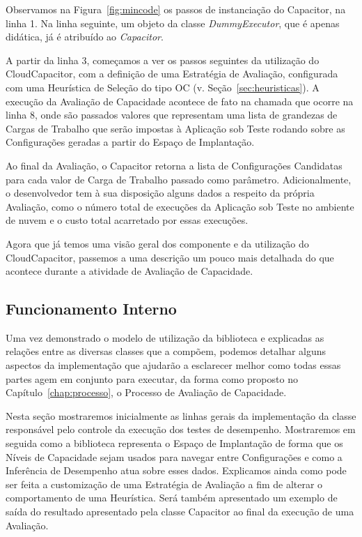 Observamos na Figura~\ref{fig:mincode} os passos de instanciação do Capacitor,
na linha 1. Na linha seguinte, um objeto da classe \emph{DummyExecutor}, que é
apenas didática, já é atribuído ao \emph{Capacitor}.

A partir da linha 3, começamos a ver os passos seguintes da utilização do 
CloudCapacitor, com a definição de uma Estratégia de Avaliação, configurada
com uma Heurística de Seleção do tipo OC (v. Seção~\ref{sec:heuristicas}).
A execução da Avaliação de Capacidade acontece de fato na chamada que ocorre
na linha 8, onde são passados valores que representam uma lista de grandezas de
Cargas de Trabalho que serão impostas à Aplicação sob Teste rodando sobre as
Configurações geradas a partir do Espaço de Implantação.

Ao final da Avaliação, o Capacitor retorna a lista de Configurações Candidatas
para cada valor de Carga de Trabalho passado como parâmetro. Adicionalmente, o
desenvolvedor tem à sua disposição alguns dados a respeito da própria Avaliação,
como o número total de execuções da Aplicação sob Teste no ambiente de nuvem e o  
custo total acarretado por essas execuções. 

Agora que já temos uma visão geral dos componente e da utilização do CloudCapacitor,
passemos a uma descrição um pouco mais detalhada do que acontece durante a atividade
de Avaliação de Capacidade.

\subsection{Funcionamento Interno}
\label{subsec:capacitor_funcionamento}
Uma vez demonstrado o modelo de utilização da biblioteca e explicadas as relações
entre as diversas classes que a compõem, podemos detalhar alguns aspectos da
implementação que ajudarão a esclarecer melhor como todas essas partes agem em
conjunto para executar, da forma como proposto no Capítulo~\ref{chap:processo},
o Processo de Avaliação de Capacidade.

Nesta seção mostraremos inicialmente as linhas gerais da implementação da classe 
responsável pelo controle da execução dos testes de desempenho. Mostraremos em 
seguida como a biblioteca representa o Espaço de Implantação de forma que os 
Níveis de Capacidade sejam usados para navegar entre Configurações e como a 
Inferência de Desempenho atua sobre esses dados. Explicamos ainda como pode ser 
feita a customização de uma Estratégia de Avaliação a fim de alterar o 
comportamento de uma Heurística. Será também apresentado um exemplo de saída do 
resultado apresentado pela classe Capacitor ao final da execução de uma Avaliação.


